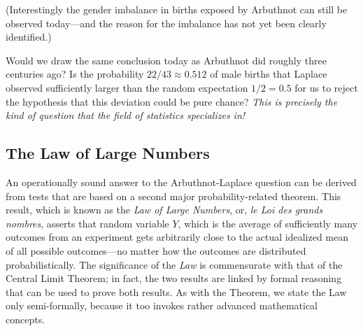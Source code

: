 \medskip

\noindent
(Interestingly the gender imbalance in births exposed by Arbuthnot can still be observed today---and the reason for the imbalance has not yet been clearly identified.)

\medskip

Would we draw the same conclusion today as Arbuthnot did roughly three centuries ago?  Is the probability $22/43 \approx 0.512$ of male births that Laplace observed sufficiently larger than the random expectation $1/2 = 0.5$ for us to reject the hypothesis that this deviation could be pure chance?  {\em This is precisely the kind of question that the field of statistics specializes in!}

\subsection{The Law of Large Numbers}
\label{sec:Large-Numbers}

 

An operationally sound answer to the Arbuthnot-Laplace question can be derived from tests that are based on a second major probability-related theorem.  This result, which is known as the {\it Law of Large Numbers}, or, {\it le Loi des grands nombres}, asserts that random variable $Y$, which is the average of sufficiently many outcomes from an experiment gets arbitrarily close to the actual idealized mean of all possible outcomes---no matter how the outcomes are distributed probabilistically.  The significance of the {\it Law} is commensurate with that of the Central Limit Theorem; in fact, the two results are linked by formal reasoning that can be used to prove both results.  As with the Theorem, we state the Law only semi-formally, because it too invokes rather advanced mathematical concepts.

\bigskip

